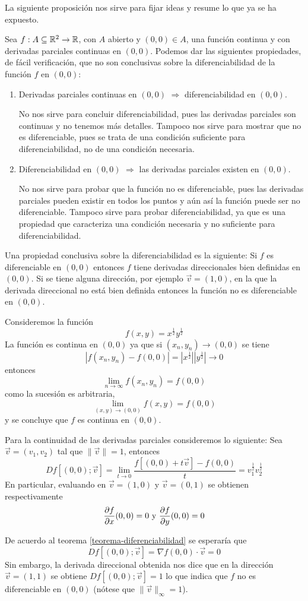 La siguiente proposici\'on nos sirve para fijar ideas y resume lo que ya se ha expuesto.
\begin{proposicion}
Sea $f:A\subseteq \mathbb{R}^2 \to \mathbb{R}$, con $A$ abierto y $(0,0)\in A$, una funci\'on continua y con derivadas parciales continuas en $(0,0)$. Podemos dar las siguientes propiedades, de f\'acil verificaci\'on, que no son conclusivas sobre la diferenciabilidad de la funci\'on $f$ en $(0,0)$:
\begin{enumerate}
\item Derivadas parciales continuas en $(0,0)$ $\Rightarrow$ diferenciabilidad en $(0,0)$.

No nos sirve para concluir diferenciabilidad, pues las derivadas parciales son continuas y no tenemos m\'as detalles. Tampoco nos sirve para mostrar que no es diferenciable, pues se trata de una condici\'on suficiente para diferenciabilidad, no de una condici\'on necesaria.

\item Diferenciabilidad en $(0,0)$ $\Rightarrow$ las derivadas parciales existen en $(0,0)$.

No nos sirve para probar que la funci\'on no es diferenciable, pues las derivadas parciales pueden existir en todos los puntos y a\'un as\'i la funci\'on puede ser no diferenciable. Tampoco sirve para probar diferenciabilidad, ya que es una propiedad que caracteriza una condici\'on necesaria y no suficiente para diferenciabilidad. 
\end{enumerate}

Una propiedad conclusiva sobre la diferenciabilidad es la siguiente: Si $f$ es diferenciable en $(0,0)$ entonces $f$ tiene derivadas direccionales bien definidas en $(0,0)$. Si se tiene alguna direcci\'on, por ejemplo $\vec{v}=(1,0)$, en la que la derivada direccional no est\'a bien definida entonces la funci\'on no es diferenciable en $(0,0)$.
\end{proposicion}

\begin{ejemplo}
Consideremos la funci\'on
$$f(x,y)=x^\frac{1}{2} y^\frac{1}{2}$$
La funci\'on es continua en $(0,0)$ ya que si $(x_n,y_n)\to (0,0)$ se tiene
$$|f(x_n,y_n)-f(0,0)|=|x^\frac{1}{2}||y^\frac{1}{2}|\to 0$$
entonces
$$\lim_{n\to \infty} f(x_n,y_n) = f(0,0)$$
como la sucesi\'on es arbitraria,
$$\lim_{(x,y)\to (0,0)} f(x,y) = f(0,0)$$
y se concluye que $f$ es continua en $(0,0)$.

Para la continuidad de las derivadas parciales consideremos lo siguiente: Sea $\vec{v}=(v_1,v_2)$ tal que $\|\vec{v}\|=1$, entonces
$$Df[(0,0);\vec{v}]=\lim_{t\to 0} \frac{f[(0,0)+t\vec{v}]-f(0,0)}{t} = v_1^\frac{1}{2} v_2^\frac{1}{2}$$
En particular, evaluando en $\vec{v}=(1,0)$ y $\vec{v}=(0,1)$ se obtienen respectivamente 
$$\frac{\partial f}{\partial x}(0,0)=0 \text{ y } \frac{\partial f}{\partial y}(0,0)=0$$

De acuerdo al teorema \ref{teorema-diferenciabilidad} se esperar\'ia que $$Df[(0,0);\vec{v}]=\nabla f(0,0)\cdot \vec{v} = 0 $$
Sin embargo, la derivada direccional obtenida nos dice que en la direcci\'on $\vec{v}=(1,1)$ se obtiene $Df[(0,0);\vec{v}] = 1$ lo que indica que $f$ no es diferenciable en $(0,0)$ (n\'otese que $\|\vec{v}\|_\infty = 1$).
\end{ejemplo}

